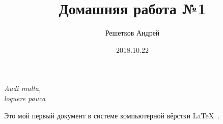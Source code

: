 \documentclass[12pt]{article}
\title{Домашняя работа №1}
\author{Решетков Андрей}
\date{2018.10.22}
\begin{document}
	\maketitle
	\begin{flushright}
		{\itshape		
			Audi multa,\\
			loquere pauca
		}
		\\[20pt]
	\end{flushright}

	Это мой первый документ в системе компьютерной вёрстки \LaTeX~.
	
	
	
	
	
	
	
	
	
	
	
	
	
	
	
	
\end{document}
